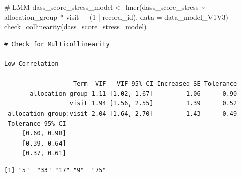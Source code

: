 \documentclass[
  letterpaper,
  DIV=11,
  numbers=noendperiod]{scrartcl}
\newenvironment{Shaded}{\begin{snugshade}}{\end{snugshade}}
\newcommand{\AttributeTok}[1]{\textcolor[rgb]{0.40,0.45,0.13}{#1}}
\newcommand{\CommentTok}[1]{\textcolor[rgb]{0.37,0.37,0.37}{#1}}
\newcommand{\DecValTok}[1]{\textcolor[rgb]{0.68,0.00,0.00}{#1}}
\newcommand{\FunctionTok}[1]{\textcolor[rgb]{0.28,0.35,0.67}{#1}}
\newcommand{\NormalTok}[1]{\textcolor[rgb]{0.00,0.23,0.31}{#1}}
\newcommand{\OtherTok}[1]{\textcolor[rgb]{0.00,0.23,0.31}{#1}}
\newcommand{\SpecialCharTok}[1]{\textcolor[rgb]{0.37,0.37,0.37}{#1}}
\newcommand{\StringTok}[1]{\textcolor[rgb]{0.13,0.47,0.30}{#1}}
\begin{document}
\begin{Shaded}
\begin{Highlighting}[]
\CommentTok{\# LMM}
\NormalTok{dass\_score\_stress\_model }\OtherTok{\textless{}{-}} \FunctionTok{lmer}\NormalTok{(dass\_score\_stress }\SpecialCharTok{\textasciitilde{}}\NormalTok{ allocation\_group }\SpecialCharTok{*}\NormalTok{ visit }\SpecialCharTok{+}\NormalTok{ (}\DecValTok{1} \SpecialCharTok{|}\NormalTok{ record\_id), }\AttributeTok{data =}\NormalTok{ data\_model\_V1V3)}
\FunctionTok{check\_collinearity}\NormalTok{(dass\_score\_stress\_model)}
\end{Highlighting}
\end{Shaded}

\begin{verbatim}
# Check for Multicollinearity

Low Correlation

                   Term  VIF   VIF 95% CI Increased SE Tolerance
       allocation_group 1.11 [1.02, 1.67]         1.06      0.90
                  visit 1.94 [1.56, 2.55]         1.39      0.52
 allocation_group:visit 2.04 [1.64, 2.70]         1.43      0.49
 Tolerance 95% CI
     [0.60, 0.98]
     [0.39, 0.64]
     [0.37, 0.61]
\end{verbatim}

\begin{Shaded}
\end{Shaded}

\begin{verbatim}
[1] "5"  "33" "17" "9"  "75"
\end{verbatim}
\end{document}
